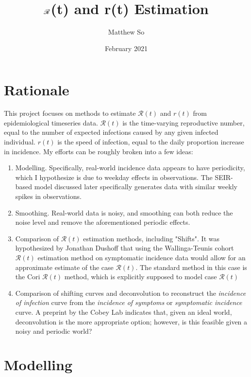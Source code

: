 \documentclass{article}
\title{$\nR$(t) and r(t) Estimation}
\author{Matthew So}
\date{February 2021}
\newcommand{\nR}{\mathscr{R}}
\begin{document}
\maketitle



\tableofcontents

\section{Rationale}
This project focuses on methods to estimate $\nR(t)$ and $r(t)$ from epidemiological timeseries data. $\nR(t)$ is the time-varying reproductive number, equal to the number of expected infections caused by any given infected individual. $r(t)$ is the speed of infection, equal to the daily proportion increase in incidence. My efforts can be roughly broken into a few ideas:

\begin{enumerate}
    \item Modelling. Specifically, real-world incidence data appears to have periodicity, which I hypothesize is due to weekday effects in observations. The SEIR-based model discussed later specifically generates data with similar weekly spikes in observations.
    \item Smoothing. Real-world data is noisy, and smoothing can both reduce the noise level and remove the aforementioned periodic effects. 
    \item Comparison of $\nR(t)$ estimation methods, including "Shifts". It was hypothesized by Jonathan Dushoff that using the Wallinga-Teunis cohort $\nR(t)$ estimation method on symptomatic incidence data would allow for an approximate estimate of the case $\nR(t)$. The standard method in this case is the Cori $\nR(t)$ method, which is explicitly supposed to model case $\nR(t)$
    \item Comparison of shifting curves and deconvolution to reconstruct the \textit{incidence of infection} curve from the \textit{incidence of symptoms} or \textit{symptomatic incidence} curve. A preprint by the Cobey Lab \cite{Gostic} indicates that, given an ideal world, deconvolution is the more appropriate option; however, is this feasible given a noisy and periodic world? 
\end{enumerate}

\section{Modelling}
\end{document}
